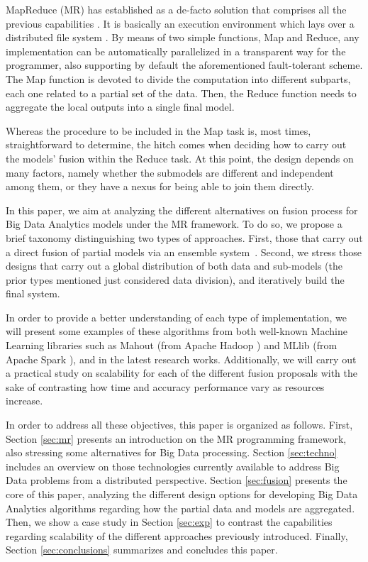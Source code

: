 \documentclass[3p,review]{elsarticle}
\begin{document}
MapReduce (MR) has established as a de-facto solution that comprises all the previous capabilities \cite{Dea08,Dean10,Lee11-MR}. It is basically an execution environment which lays over a distributed file system \cite{Shvachko10-HDFS}. By means of two simple functions, Map and Reduce, any implementation can be automatically parallelized in a transparent way for the programmer, also supporting by default the aforementioned fault-tolerant scheme. The Map function is devoted to divide the computation into different subparts, each one related to a partial set of the data. Then, the Reduce function needs to aggregate the local outputs into a single final model. 

Whereas the procedure to be included in the Map task is, most times, straightforward to determine, the hitch comes when deciding how to carry out the models' fusion within the Reduce task. At this point, the design depends on many factors, namely whether the submodels are different and independent among them, or they have a nexus for being able to join them directly. 

In this paper, we aim at analyzing the different alternatives on fusion process for Big Data Analytics models under the MR framework. To do so, we propose a brief taxonomy distinguishing two types of approaches. First, those that carry out a direct fusion of partial models via an ensemble system~\cite{krawczyk17}. Second, we stress those designs that carry out a global distribution of both data and sub-models (the prior types mentioned just considered data division), and iteratively build the final system.

In order to provide a better understanding of each type of implementation, we will present some examples of these algorithms from both well-known Machine Learning libraries such as Mahout \cite{Owe11,Mahout17,Mahout16-Book} (from Apache Hadoop \cite{Lam11,Whi15-Hadoop}) and MLlib \cite{mllib15} (from Apache Spark \cite{Zaharia10,zaharia12}), and in the latest research works. Additionally, we will carry out a practical study on scalability for each of the different fusion proposals with the sake of contrasting how time and accuracy performance vary as resources increase. 

In order to address all these objectives, this paper is organized as follows. First, Section \ref{sec:mr} presents an introduction on the MR programming framework, also stressing some alternatives for Big Data processing. Section \ref{sec:techno} includes an overview on those technologies currently available to address Big Data problems from a distributed perspective. Section \ref{sec:fusion} presents the core of this paper, analyzing the different design options for developing Big Data Analytics algorithms regarding how the partial data and models are aggregated. Then, we show a case study in Section \ref{sec:exp} to contrast the capabilities regarding scalability of the different approaches previously introduced. Finally, Section \ref{sec:conclusions} summarizes and concludes this paper.
\end{document}
